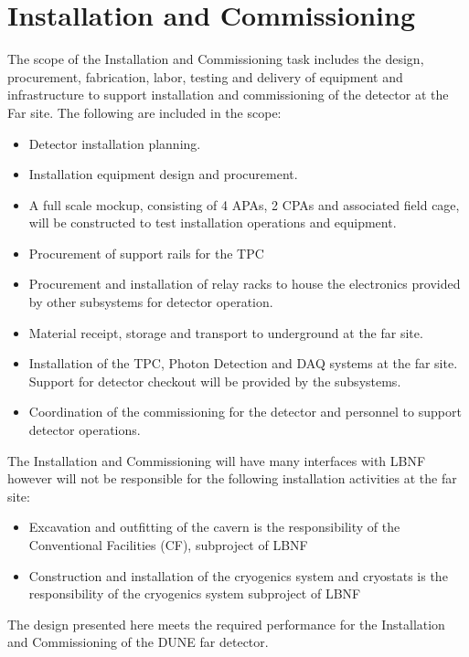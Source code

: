 \section{Installation and Commissioning}
\label{sec:detectors-fd-ref-install}

The scope of the Installation and Commissioning task includes the
design, procurement, fabrication, labor, testing and delivery of
equipment and infrastructure to support installation and commissioning
of the detector at the Far site. The following are included in the
scope:
\begin{itemize}
\item Detector installation planning.
\item Installation equipment design and procurement.
\item A full scale mockup, consisting of 4 APAs, 2 CPAs and associated
  field cage, will be constructed to test installation operations and
  equipment.
\item Procurement of support rails for the TPC
\item Procurement and installation of relay racks to house the
  electronics provided by other subsystems for detector operation.
\item Material receipt, storage and transport to underground at the far site.
\item Installation of the TPC, Photon Detection and DAQ systems at the
  far site.  Support for detector checkout will be provided by the
  subsystems.
\item Coordination of the commissioning for the detector and personnel
  to support detector operations.
\end{itemize}

The Installation and Commissioning will have many interfaces with LBNF
however will not be responsible for the following installation
activities at the far site:
\begin{itemize}
\item Excavation and outfitting of the cavern is the responsibility of
  the Conventional Facilities (CF), subproject of LBNF
\item Construction and installation of the cryogenics system and
  cryostats is the responsibility of the cryogenics system subproject
  of LBNF
\end{itemize}

The design presented here meets the required performance for the
Installation and Commissioning of the DUNE far detector.

